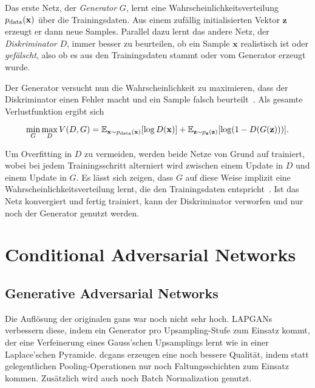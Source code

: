 Das erste Netz, der \emph{Generator} $ G $, lernt eine Wahrscheinlichkeitsverteilung $ p_{\textup{data}}(\mathbf{x}) $ über die Trainingsdaten.
Aus einem zufällig initialisierten Vektor $ \mathbf{z} $ erzeugt er dann neue Samples.
Parallel dazu lernt das andere Netz, der \emph{Diskriminator} $ D $, immer besser zu beurteilen, ob ein Sample $ \mathbf{x} $ realistisch ist oder \emph{gefälscht}, also ob es aus den Trainingsdaten stammt oder vom Generator erzeugt wurde.

Der Generator versucht nun die Wahrscheinlichkeit zu maximieren, dass der Diskriminator einen Fehler macht und ein Sample falsch beurteilt~\cite{Goodfellow.2014}.
Als gesamte Verlustfunktion ergibt sich

\begin{equation}
\min_G \max_D V(D, G) = \mathbb{E}_{\mathbf{x} \sim p_{\textup{data}}(\mathbf{x})} [\log D(\mathbf{x})] + \mathbb{E}_{\mathbf{z} \sim p_{\mathbf{z}}(\mathbf{z})} [\log(1 - D(G(\mathbf{z})))].
\end{equation}

Um Overfitting in $ D $ zu vermeiden, werden beide Netze von Grund auf trainiert, wobei bei jedem Trainingsschritt alterniert wird zwischen einem Update in $ D $ und einem Update in $ G $.
Es lässt sich zeigen, dass $ G $ auf diese Weise implizit eine Wahrscheinlichkeitsverteilung lernt, die den Trainingsdaten entspricht~\cite{Goodfellow.2014}.
Ist das Netz konvergiert und fertig trainiert, kann der Diskriminator verworfen und nur noch der Generator genutzt werden.



\section{Conditional Adversarial Networks}

\subsection{Generative Adversarial Networks}

Die Auflösung der originalen \glspl{gan} war noch nicht sehr hoch.
LAPGANs verbessern diese, indem ein Generator pro Upsampling-Stufe zum Einsatz kommt, der eine Verfeinerung eines Gauss'schen Upsamplings lernt wie in einer Laplace'schen Pyramide.
\glspl{dcgan} erzeugen eine noch bessere Qualität, indem statt gelegentlichen Pooling-Operationen nur noch Faltungsschichten zum Einsatz kommen.
Zusätzlich wird auch noch Batch Normalization genutzt.

